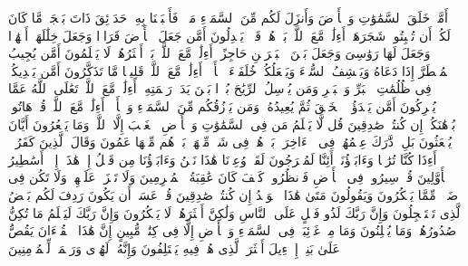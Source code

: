 أَمَّنۡ خَلَقَ ٱلسَّمَٰوَٰتِ وَٱلۡأَرۡضَ وَأَنزَلَ لَكُم مِّنَ ٱلسَّمَاۤءِ مَاۤءࣰ فَأَنۢبَتۡنَا بِهِۦ حَدَاۤئِقَ ذَاتَ بَهۡجَةࣲ مَّا كَانَ لَكُمۡ أَن تُنۢبِتُوا۟ شَجَرَهَاۤۗ أَءِلَٰهࣱ مَّعَ ٱللَّهِۚ بَلۡ هُمۡ قَوۡمࣱ یَعۡدِلُونَ%
\stopbuffer%
\startbuffer[\q:27:61]
أَمَّن جَعَلَ ٱلۡأَرۡضَ قَرَارࣰا وَجَعَلَ خِلَٰلَهَاۤ أَنۡهَٰرࣰا وَجَعَلَ لَهَا رَوَٰسِیَ وَجَعَلَ بَیۡنَ ٱلۡبَحۡرَیۡنِ حَاجِزًاۗ أَءِلَٰهࣱ مَّعَ ٱللَّهِۚ بَلۡ أَكۡثَرُهُمۡ لَا یَعۡلَمُونَ%
\stopbuffer%
\startbuffer[\q:27:62]
أَمَّن یُجِیبُ ٱلۡمُضۡطَرَّ إِذَا دَعَاهُ وَیَكۡشِفُ ٱلسُّوۤءَ وَیَجۡعَلُكُمۡ خُلَفَاۤءَ ٱلۡأَرۡضِۗ أَءِلَٰهࣱ مَّعَ ٱللَّهِۚ قَلِیلࣰا مَّا تَذَكَّرُونَ%
\stopbuffer%
\startbuffer[\q:27:63]
أَمَّن یَهۡدِیكُمۡ فِی ظُلُمَٰتِ ٱلۡبَرِّ وَٱلۡبَحۡرِ وَمَن یُرۡسِلُ ٱلرِّیَٰحَ بُشۡرَۢا بَیۡنَ یَدَیۡ رَحۡمَتِهِۦۤۗ أَءِلَٰهࣱ مَّعَ ٱللَّهِۚ تَعَٰلَى ٱللَّهُ عَمَّا یُشۡرِكُونَ%
\stopbuffer%
\startbuffer[\q:27:64]
أَمَّن یَبۡدَؤُا۟ ٱلۡخَلۡقَ ثُمَّ یُعِیدُهُۥ وَمَن یَرۡزُقُكُم مِّنَ ٱلسَّمَاۤءِ وَٱلۡأَرۡضِۗ أَءِلَٰهࣱ مَّعَ ٱللَّهِۚ قُلۡ هَاتُوا۟ بُرۡهَٰنَكُمۡ إِن كُنتُمۡ صَٰدِقِینَ%
\stopbuffer%
\startbuffer[\q:27:65]
قُل لَّا یَعۡلَمُ مَن فِی ٱلسَّمَٰوَٰتِ وَٱلۡأَرۡضِ ٱلۡغَیۡبَ إِلَّا ٱللَّهُۚ وَمَا یَشۡعُرُونَ أَیَّانَ یُبۡعَثُونَ%
\stopbuffer%
\startbuffer[\q:27:66]
بَلِ ٱدَّٰرَكَ عِلۡمُهُمۡ فِی ٱلۡءَاخِرَةِۚ بَلۡ هُمۡ فِی شَكࣲّ مِّنۡهَاۖ بَلۡ هُم مِّنۡهَا عَمُونَ%
\stopbuffer%
\startbuffer[\q:27:67]
وَقَالَ ٱلَّذِینَ كَفَرُوۤا۟ أَءِذَا كُنَّا تُرَٰبࣰا وَءَابَاۤؤُنَاۤ أَئِنَّا لَمُخۡرَجُونَ%
\stopbuffer%
\startbuffer[\q:27:68]
لَقَدۡ وُعِدۡنَا هَٰذَا نَحۡنُ وَءَابَاۤؤُنَا مِن قَبۡلُ إِنۡ هَٰذَاۤ إِلَّاۤ أَسَٰطِیرُ ٱلۡأَوَّلِینَ%
\stopbuffer%
\startbuffer[\q:27:69]
قُلۡ سِیرُوا۟ فِی ٱلۡأَرۡضِ فَٱنظُرُوا۟ كَیۡفَ كَانَ عَٰقِبَةُ ٱلۡمُجۡرِمِینَ%
\stopbuffer%
\startbuffer[\q:27:70]
وَلَا تَحۡزَنۡ عَلَیۡهِمۡ وَلَا تَكُن فِی ضَیۡقࣲ مِّمَّا یَمۡكُرُونَ%
\stopbuffer%
\startbuffer[\q:27:71]
وَیَقُولُونَ مَتَىٰ هَٰذَا ٱلۡوَعۡدُ إِن كُنتُمۡ صَٰدِقِینَ%
\stopbuffer%
\startbuffer[\q:27:72]
قُلۡ عَسَىٰۤ أَن یَكُونَ رَدِفَ لَكُم بَعۡضُ ٱلَّذِی تَسۡتَعۡجِلُونَ%
\stopbuffer%
\startbuffer[\q:27:73]
وَإِنَّ رَبَّكَ لَذُو فَضۡلٍ عَلَى ٱلنَّاسِ وَلَٰكِنَّ أَكۡثَرَهُمۡ لَا یَشۡكُرُونَ%
\stopbuffer%
\startbuffer[\q:27:74]
وَإِنَّ رَبَّكَ لَیَعۡلَمُ مَا تُكِنُّ صُدُورُهُمۡ وَمَا یُعۡلِنُونَ%
\stopbuffer%
\startbuffer[\q:27:75]
وَمَا مِنۡ غَاۤئِبَةࣲ فِی ٱلسَّمَاۤءِ وَٱلۡأَرۡضِ إِلَّا فِی كِتَٰبࣲ مُّبِینٍ%
\stopbuffer%
\startbuffer[\q:27:76]
إِنَّ هَٰذَا ٱلۡقُرۡءَانَ یَقُصُّ عَلَىٰ بَنِیۤ إِسۡرَٰۤءِیلَ أَكۡثَرَ ٱلَّذِی هُمۡ فِیهِ یَخۡتَلِفُونَ%
\stopbuffer%
\startbuffer[\q:27:77]
وَإِنَّهُۥ لَهُدࣰى وَرَحۡمَةࣱ لِّلۡمُؤۡمِنِینَ%
